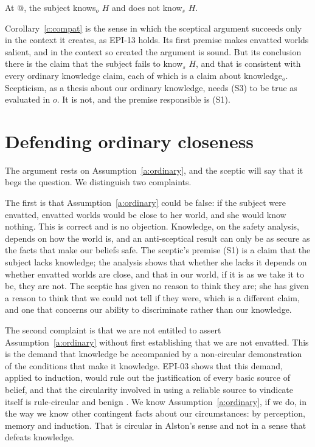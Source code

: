 \documentclass{situationist-preprint}
\begin{document}
\begin{corollary}[Compatibility]\label{c:compat}
At $@$, the subject knows$_o$ $H$ and does not know$_s$ $H$.
\end{corollary}

Corollary~\ref{c:compat} is the sense in which the sceptical argument succeeds only in the context it creates, as EPI-13 holds. Its first premise makes envatted worlds salient, and in the context so created the argument is sound. But its conclusion there is the claim that the subject fails to know$_s$ $H$, and that is consistent with every ordinary knowledge claim, each of which is a claim about knowledge$_o$. Scepticism, as a thesis about our ordinary knowledge, needs (S3) to be true as evaluated in $o$. It is not, and the premise responsible is (S1).

\section{Defending ordinary closeness}

The argument rests on Assumption~\ref{a:ordinary}, and the sceptic will say that it begs the question. We distinguish two complaints.

The first is that Assumption~\ref{a:ordinary} could be false: if the subject were envatted, envatted worlds would be close to her world, and she would know nothing. This is correct and is no objection. Knowledge, on the safety analysis, depends on how the world is, and an anti-sceptical result can only be as secure as the facts that make our beliefs safe. The sceptic's premise (S1) is a claim that the subject lacks knowledge; the analysis shows that whether she lacks it depends on whether envatted worlds are close, and that in our world, if it is as we take it to be, they are not. The sceptic has given no reason to think they are; she has given a reason to think that we could not tell if they were, which is a different claim, and one that concerns our ability to discriminate rather than our knowledge.

The second complaint is that we are not entitled to assert Assumption~\ref{a:ordinary} without first establishing that we are not envatted. This is the demand that knowledge be accompanied by a non-circular demonstration of the conditions that make it knowledge. EPI-03 shows that this demand, applied to induction, would rule out the justification of every basic source of belief, and that the circularity involved in using a reliable source to vindicate itself is rule-circular and benign \citep{Alston1986}. We know Assumption~\ref{a:ordinary}, if we do, in the way we know other contingent facts about our circumstances: by perception, memory and induction. That is circular in Alston's sense and not in a sense that defeats knowledge.
\end{document}
